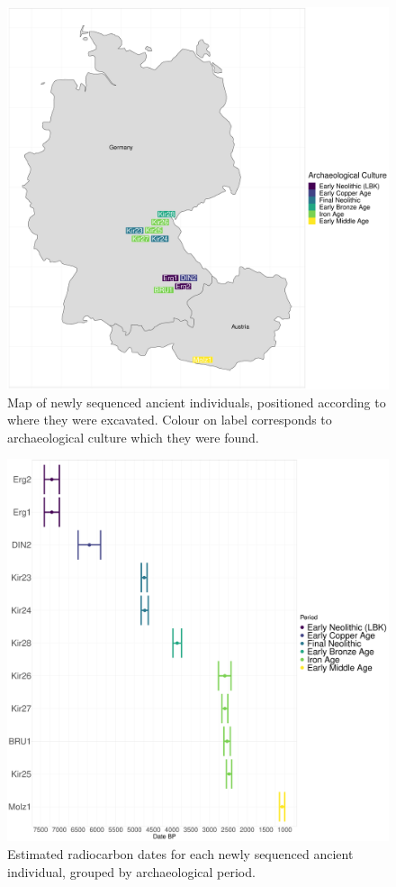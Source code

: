 \begin{figure}[htp]
    \centering
    \includegraphics[width=1.0\textwidth]{../images/chapter4/sample_map.pdf}
    \caption{Map of newly sequenced ancient individuals, positioned according to where they were excavated. Colour on label corresponds to archaeological culture which they were found. }
    \label{fig:chapter4_intro_SamplesMap}
\end{figure}

\begin{figure}[htp]
    \centering
    \includegraphics[width=1.0\textwidth]{../images/chapter4/Dates.pdf}
    \caption{Estimated radiocarbon dates for each newly sequenced ancient individual, grouped by archaeological period. }
    \label{fig:chapter4_intro_SamplesDates}
\end{figure}

